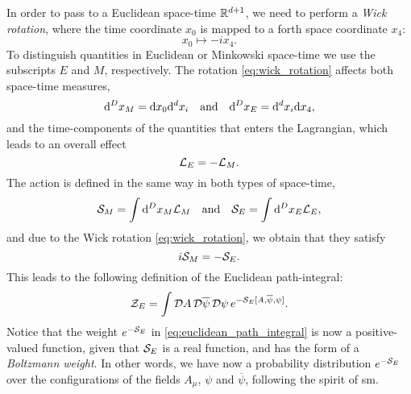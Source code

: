 In order to pass to a Euclidean space-time $\mathbb{R}^{d+1}$, we need to perform a \emph{Wick rotation},
where the time coordinate $x_0$ is mapped to a forth space coordinate $x_4$:
\begin{equation*}
    x_0 \mapsto - i x_4.
    \label{eq:wick_rotation}
\end{equation*}
To distinguish quantities in Euclidean or Minkowski space-time we use the subscripts $E$ and $M$, respectively.
The rotation \eqref{eq:wick_rotation} affects both space-time measures,
\begin{equation*}
    \dd^D x_M = \dd x_0 \dd^d x_i \qand
    \dd^D x_E = \dd^d x_i \dd x_4,
\end{equation*}
and the time-components of the quantities that enters the Lagrangian, which leads to an overall effect
\begin{equation*}
    \mathcal{L}_E = - \mathcal{L}_M.
\end{equation*}
The action is defined in the same way in both types of space-time,
\begin{equation*}
    \Action_M = \int \dd^D x_M \Lagrangian_M
    \qand
    \Action_E = \int \dd^D x_E \Lagrangian_E,
\end{equation*}
and due to the Wick rotation \eqref{eq:wick_rotation}, we obtain that they satisfy
\begin{equation}
    i \mathcal{S}_M = - \mathcal{S}_E.
\end{equation}
This leads to the following definition of the Euclidean path-integral:
\begin{equation}
    \mathcal{Z}_E = \int \mathcal{D} A\, \mathcal{D} \overline{\psi}\, \mathcal{D} \psi\, e^{-\mathcal{S}_E[A, \overline{\psi}, \psi]}.
    \label{eq:euclidean_path_integral}
\end{equation}
Notice that the weight $e^{-\mathcal{S}_E}$ in \eqref{eq:euclidean_path_integral} is now a positive-valued function, given that $\mathcal{S}_E$ is a real function, and has the form of a \emph{Boltzmann weight}.
In other words, we have now a probability distribution $e^{- \mathcal{S}_E}$ over the configurations of the fields $A_{\mu}$, $\psi$ and $\overline{\psi}$, following the spirit of \ac{sm}.


